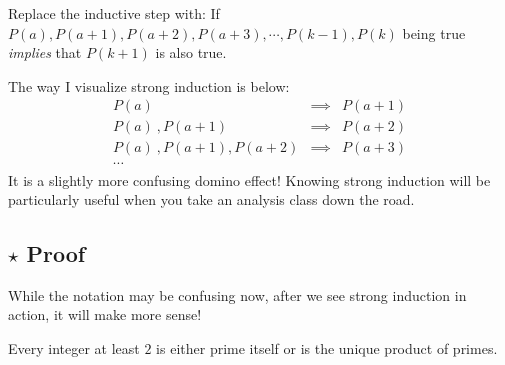 \clearpage
\begin{defi} Replace the inductive step with: If $P(a), P(a+1), P(a+2), P(a+3), \cdots, P(k-1), P(k)$ being true \textit{implies} that $P(k+1)$ is also true.  \end{defi} The way I visualize strong induction is below:
\begin{eqnarray*} P(a)&\implies& P(a+1) \\ 
				 P(a)\:, P(a+1) &\implies& P(a+2) \\
				 P(a)\:, P(a+1), P(a+2) &\implies& P(a+3) \\
				 \cdots
\end{eqnarray*}
It is a slightly more confusing domino effect! Knowing strong induction will be particularly useful when you take an analysis class down the road.
\clearpage
\subsection{$\star$ Proof}
While the notation may be confusing now, after we see strong induction in action, it will make more sense!

\begin{theorem} Every integer at least $2$ is either prime itself or is the unique product of primes. \end{theorem}

